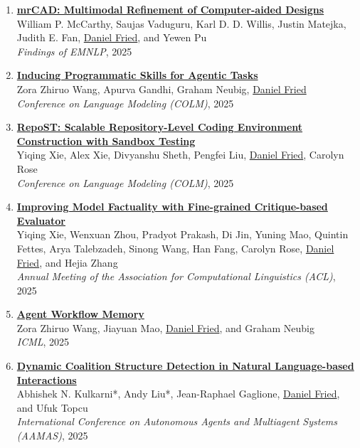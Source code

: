 \begin{enumerate}[leftmargin=-1mm,partopsep=0pt]
\item \href{https://arxiv.org/abs/2504.20294}{\textbf{mrCAD: Multimodal Refinement of Computer-aided Designs}} \\
  William P. McCarthy, Saujas Vaduguru, Karl D. D. Willis, Justin Matejka, Judith E. Fan, \underline{Daniel Fried}, and Yewen Pu\\
  \emph{Findings of EMNLP}, 2025

\item \href{https://arxiv.org/abs/2504.06821}{\textbf{Inducing Programmatic Skills for Agentic Tasks}} \\
  Zora Zhiruo Wang, Apurva Gandhi, Graham Neubig, \underline{Daniel Fried}\\
  \emph{Conference on Language Modeling (COLM)}, 2025

\item \href{https://arxiv.org/abs/2503.07358}{\textbf{RepoST: Scalable Repository-Level Coding Environment Construction with Sandbox Testing}} \\
  Yiqing Xie, Alex Xie, Divyanshu Sheth, Pengfei Liu, \underline{Daniel Fried}, Carolyn Rose\\
  \emph{Conference on Language Modeling (COLM)}, 2025

\item \href{https://arxiv.org/abs/2410.18359}{\textbf{Improving Model Factuality with Fine-grained Critique-based Evaluator}} \\
  Yiqing Xie, Wenxuan Zhou, Pradyot Prakash, Di Jin, Yuning Mao, Quintin Fettes, Arya Talebzadeh, Sinong Wang, Han Fang, Carolyn Rose, \underline{Daniel Fried}, and Hejia Zhang\\
  \emph{Annual Meeting of the Association for Computational Linguistics (ACL)}, 2025

\item \href{https://arxiv.org/abs/2409.07429}{\textbf{Agent Workflow Memory}} \\
  Zora Zhiruo Wang, Jiayuan Mao, \underline{Daniel Fried}, and Graham Neubig\\
  \emph{ICML}, 2025

\item \href{https://arxiv.org/abs/2502.16339}{\textbf{Dynamic Coalition Structure Detection in Natural Language-based Interactions}} \\
  Abhishek N. Kulkarni*, Andy Liu*, Jean-Raphael Gaglione, \underline{Daniel Fried}, and Ufuk Topcu\\
  \emph{International Conference on Autonomous Agents and Multiagent Systems (AAMAS)}, 2025


\end{enumerate}
